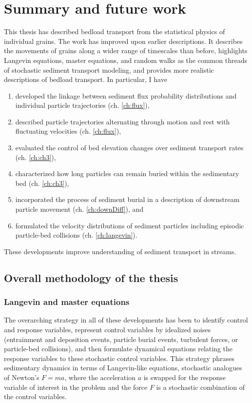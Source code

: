 
\chapter{Summary and future work}
\label{ch:conc}

This thesis has described bedload transport from the statistical physics of individual grains.
The work has improved upon earlier descriptions.
It describes the movements of grains along a wider range of timescales than before, highlights Langevin equations, master equations, and random walks as the common threads of stochastic sediment transport modeling, and provides more realistic descriptions of bedload transport. In particular, I have
\begin{enumerate}
	\item developed the linkage between sediment flux probability distributions and individual particle trajectories (ch. \ref{ch:flux}), 
	\item described particle trajectories alternating through motion and rest with fluctuating velocities (ch. \ref{ch:flux}),
	\item evaluated the control of bed elevation changes over sediment transport rates (ch. \ref{ch:ch3}),
	\item characterized how long particles can remain buried within the sedimentary bed (ch. \ref{ch:ch3}),
	\item incorporated the process of sediment burial in a description of downstream particle movement (ch. \ref{ch:downDiff}), and
	\item formulated the velocity distributions of sediment particles including episodic particle-bed collisions (ch. \ref{ch:langevin}).
\end{enumerate}
These developments improve understanding of sediment transport in streams.

\section{Overall methodology of the thesis}

\subsection{Langevin and master equations}

The overarching strategy in all of these developments has been to identify control and response variables, represent control variables by idealized noises (entrainment and deposition events, particle burial events, turbulent forces, or particle-bed collisions), and then formulate dynamical equations relating the response variables to these stochastic control variables.
This strategy phrases sedimentary dynamics in terms of Langevin-like equations, stochastic analogues of Newton's $F=ma$, where the acceleration $a$ is swapped for the response variable of interest in the problem and the force $F$ is a stochastic combination of the control variables. 

